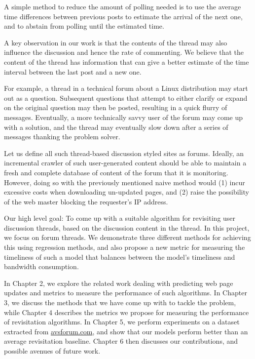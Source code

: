 A simple method to reduce the amount of polling needed is to use the
average time differences between previous posts to estimate the
arrival of the next one, and to abstain from polling until the
estimated time.

A key observation in our work is that the contents of the thread may
also influence the discussion and hence the rate of commenting.  We
believe that the content of the thread has information that can give a
better estimate of the time interval between the last post and a new
one.

For example, a thread in a technical forum about a Linux distribution may start 
out as a question. Subsequent questions that attempt to either clarify or expand 
on the original question may then be posted, resulting in a quick flurry of 
messages. Eventually, a more technically savvy user of the forum may come up 
with a solution, and the thread may eventually slow down after a series of 
messages thanking the problem solver. 

Let us define all such thread-based discussion styled sites as forums. Ideally, 
an incremental crawler of such user-generated content should be able to maintain 
a fresh and complete database of content of the forum that it is monitoring.  
However, doing so with the previously mentioned naive method would (1) incur 
excessive costs when downloading un-updated pages, and (2) raise the possibility 
of the web master blocking the requester's IP address.

Our high level goal: To come up with a suitable algorithm for revisiting user 
discussion threads, based on the discussion content in the thread. In this 
project, we focus on forum threads. We demonstrate three different methods for 
achieving this using regression methods, and also propose a new metric for 
measuring the timeliness of such a model that balances between the model's 
timeliness and bandwidth consumption.

In Chapter 2, we explore the related work dealing with predicting web page 
updates and metrics to measure the performance of such algorithms. In Chapter 3, 
we discuss the methods that we have come up with to tackle the problem, while 
Chapter 4 describes the metrics we propose for measuring the performance of 
revisitation algorithms. In Chapter 5, we perform experiments on a dataset 
extracted from \url{avsforum.com}, and show that our models perform better than 
an average revisitation baseline. Chapter 6 then discusses our contributions, 
and possible avenues of future work.
